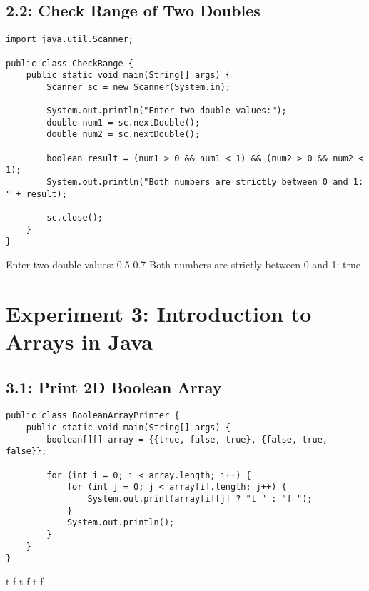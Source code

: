 \documentclass[a4paper,12pt]{article}
\begin{document}
\clearpage
\subsection{2.2: Check Range of Two Doubles}
\begin{samepage}
\begin{lstlisting}[caption={CheckRange.java}]
import java.util.Scanner;

public class CheckRange {
    public static void main(String[] args) {
        Scanner sc = new Scanner(System.in);
        
        System.out.println("Enter two double values:");
        double num1 = sc.nextDouble();
        double num2 = sc.nextDouble();
        
        boolean result = (num1 > 0 && num1 < 1) && (num2 > 0 && num2 < 1);
        System.out.println("Both numbers are strictly between 0 and 1: " + result);
        
        sc.close();
    }
}
\end{lstlisting}

\begin{outputlisting}
Enter two double values:
0.5 0.7
Both numbers are strictly between 0 and 1: true
\end{outputlisting}
\end{samepage}

\section{Experiment 3: Introduction to Arrays in Java}

\clearpage
\subsection{3.1: Print 2D Boolean Array}
\begin{samepage}
\begin{lstlisting}[caption={BooleanArrayPrinter.java}]
public class BooleanArrayPrinter {
    public static void main(String[] args) {
        boolean[][] array = {{true, false, true}, {false, true, false}};
        
        for (int i = 0; i < array.length; i++) {
            for (int j = 0; j < array[i].length; j++) {
                System.out.print(array[i][j] ? "t " : "f ");
            }
            System.out.println();
        }
    }
}
\end{lstlisting}

\begin{outputlisting}
t f t 
f t f 
\end{outputlisting}
\end{samepage}
\end{document}
